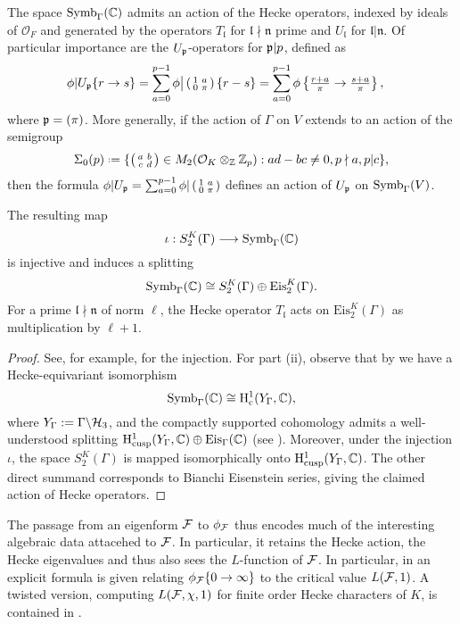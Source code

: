 \documentclass[a4paper,11pt]{article}
\newcommand{\fl}{\mathfrak{l}}
\newcommand{\cO}{\mathcal{O}}
\numberwithin{equation}{section}
\newcommand{\fn}{\mathfrak{n}}
\begin{document}
The space $\mathrm{Symb}_\Gamma(\mathbb{C})$ admits an action of the Hecke operators, indexed by ideals of $\cO_F$ and generated by the operators $T_{\fl}$ for $\fl\nmid\fn$ prime and $U_{\fl}$ for $\fl|\fn$. Of particular importance are the $U_{\mathfrak{p}}$-operators for $\mathfrak{p}|p$, defined as
\begin{align*}
	\phi|U_{\mathfrak{p}} \{r\to s\} &= \sum_{a=0}^{p-1} \phi\big|\left(\begin{smallmatrix}1 & a\\0 & \pi\end{smallmatrix}\right)\{r-s\} = \sum_{a=0}^{p-1}\phi\left\{\tfrac{r+a}{\pi} \to \tfrac{s+a}{\pi}\right\},
\end{align*}
where $\mathfrak{p} = (\pi)$. More generally, if the action of $\Gamma$ on $V$ extends to an action of the semigroup
\[
\Sigma_0(p) \defeq \{\smallmatrd{a}{b}{c}{d} \in M_2(\roi_K\otimes_{\Z}\Zp) :  ad-bc \neq 0, p\nmid a, p|c\},
\] 
then the formula $\phi|U_{\mathfrak{p}} = \sum_{a = 0}^{p-1}\phi|\left(\begin{smallmatrix}1 & a\\0 & \pi\end{smallmatrix}\right)$ defines an action of $U_{\mathfrak{p}}$ on $\mathrm{Symb}_\Gamma(V)$.

\begin{proposition}
 The resulting map 
    \[
        \iota : S_2^K(\Gamma) \longrightarrow \mathrm{Symb}_\Gamma(\mathbb{C})
    \]
    is injective and induces a splitting
    \[
        \mathrm{Symb}_\Gamma(\mathbb{C}) \cong S_2^K(\Gamma) \oplus \mathrm{Eis}_2^K(\Gamma).
    \]
    For a prime $\fl\nmid \fn$ of norm $\ell$, the Hecke operator $T_{\fl}$ acts on $\mathrm{Eis}_2^K(\Gamma)$ as multiplication by $\ell+1$.
\end{proposition}
\begin{proof}
    See, for example, \cite{Wil17} for the injection. For part (ii), observe that by \cite[Lemma 8.2]{BW17} we have a Hecke-equivariant isomorphism
    \[
        \mathrm{Symb}_\Gamma(\mathbb{C}) \cong \mathrm{H}^1_{\mathrm{c}}(Y_\Gamma, \mathbb{C}),
    \]
    where $Y_\Gamma := \Gamma\backslash\mathcal{H}_3$, and the compactly supported cohomology admits a well-understood splitting $\mathrm{H}^1_{\mathrm{cusp}}(Y_\Gamma,\mathbb{C}) \oplus \mathrm{Eis}_\Gamma(\mathbb{C})$ (see \cite[\S3.2.5]{Har87}). Moreover, under the injection $\iota$, the space $S_2^K(\Gamma)$ is mapped isomorphically onto $\mathrm{H}^1_{\mathrm{cusp}}(Y_\Gamma,\mathbb{C})$. The other direct summand corresponds to Bianchi Eisenstein series, giving the claimed action of Hecke operators.
\end{proof}

The passage from an eigenform $\mathcal{F}$ to $\phi_{\mathcal{F}}$ thus encodes much of the interesting algebraic data attacehed to $\mathcal{F}$. In particular, it retains the Hecke action, the Hecke eigenvalues and thus also sees the $L$-function of $\mathcal{F}$. In particular, in \cite{CrWh94} an explicit formula is given relating $\phi_{\mathcal{F}}\{0\to\infty\}$ to the critical value $L(\mathcal{F},1)$. A twisted version, computing $L(\mathcal{F},\chi,1)$ for finite order Hecke characters of $K$, is contained in \cite[Prop.\ 2.8]{Wil17}.
\end{document}
